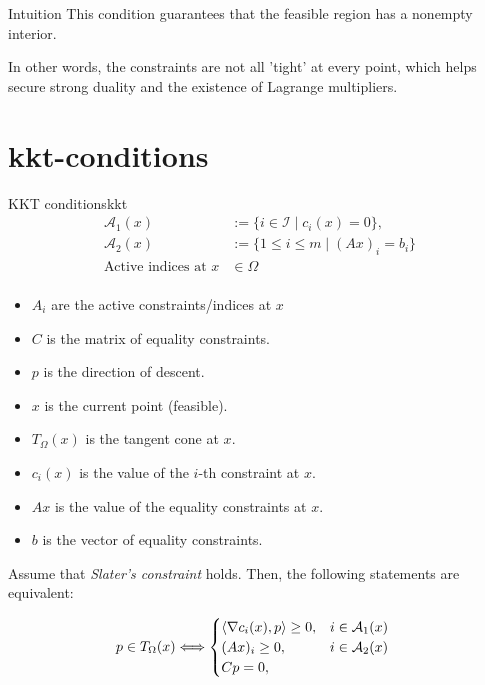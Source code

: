 \begin{remark}{Intuition}{}
  This condition guarantees that the feasible region has a nonempty interior.

  In other words, the constraints are not all 'tight' at every point, which helps secure strong duality and the existence of Lagrange multipliers.
\end{remark}

\section[KKT-betingelser]{\gls{kkt-conditions}}

\begin{theorem}{KKT conditions}{kkt}
  \begin{align*}
    \mathcal{A}_1(x)            & := \{i \in \mathcal{I} \mid c_i(x) = 0\},                     \\
    \mathcal{A}_2(x)            & := \{1 \leq i \leq m \mid (Ax)_i = b_i\} \tag{Active indices} \\
    \text{Active indices at } x & \in \Omega                                                    \\
  \end{align*}

  \begin{itemize}
    \item \(A_i\) are the active constraints/indices at \(x\)
    \item \(C\) is the matrix of equality constraints.
    \item \(p\) is the direction of descent.
    \item \(x\) is the current point (feasible).
    \item \(T_{\Omega}(x)\) is the tangent cone at \(x\).
    \item \(c_i(x)\) is the value of the \(i\)-th constraint at \(x\).
    \item \(Ax\) is the value of the equality constraints at \(x\).
    \item \(b\) is the vector of equality constraints.
  \end{itemize}

  Assume that \emph{Slater's constraint} holds. Then, the following statements are equivalent:

  \begin{align*}
    p\in T_{\Omega}(x) & \Longleftrightarrow
    \begin{cases}
      \langle\nabla c_i(x), p\rangle \geq 0, & i \in \mathcal{A}_1(x) \\
      (Ax)_i \geq 0,                   & i \in \mathcal{A}_2(x) \\
      Cp = 0,                          &                        \\
    \end{cases}
  \end{align*}

\end{theorem}


